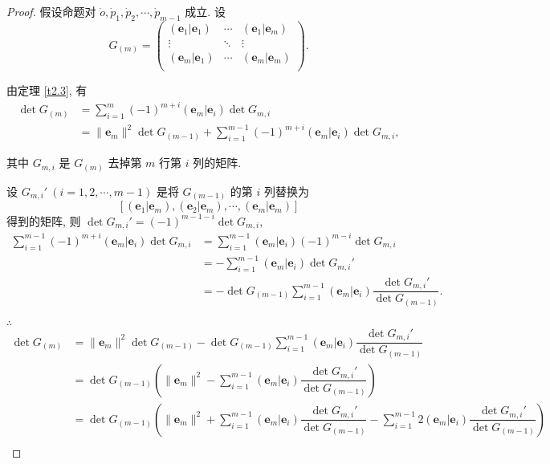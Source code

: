 \documentclass[color=black,device=normal,lang=cn,mode=geye]{elegantnote}
\begin{document}
\begin{proof}
    假设命题对 $\dot{o},\dot{p}_1,\dot{p}_2,\cdots,\dot{p}_{m-1}$ 成立. 设
    \[G_{(m)}=\begin{pmatrix}
        (\boldsymbol{e}_1|\boldsymbol{e}_1) & \cdots & (\boldsymbol{e}_1|\boldsymbol{e}_m) \\
        \vdots & \ddots & \vdots \\
        (\boldsymbol{e}_m|\boldsymbol{e}_1) & \cdots & (\boldsymbol{e}_m|\boldsymbol{e}_m) \\
    \end{pmatrix}.\]
    
    由定理 \ref{t2.3}, 有
    \begin{align*}
        \det G_{(m)} & =\sum\limits_{i=1}^m(-1)^{m+i}(\boldsymbol{e}_m|\boldsymbol{e}_i)\det G_{m,i} \\
        & =\|\boldsymbol{e}_m\|^2\det G_{(m-1)}+\sum\limits_{i=1}^{m-1}(-1)^{m+i}(\boldsymbol{e}_m|\boldsymbol{e}_i)\det G_{m,i},
    \end{align*}

    其中 $G_{m,i}$ 是 $G_{(m)}$ 去掉第 $m$ 行第 $i$ 列的矩阵.
    
    设 $G_{m,i}'\ (i=1,2,\cdots,m-1)$ 是将 $G_{(m-1)}$ 的第 $i$ 列替换为
    \[[(\boldsymbol{e}_1|\boldsymbol{e}_m),(\boldsymbol{e}_2|\boldsymbol{e}_m),\cdots,(\boldsymbol{e}_m|\boldsymbol{e}_m)]\]
    得到的矩阵, 则 $\det G_{m,i}'=(-1)^{m-1-i}\det G_{m,i}$,
    \begin{align*}
        \sum\limits_{i=1}^{m-1}(-1)^{m+i}(\boldsymbol{e}_m|\boldsymbol{e}_i)\det G_{m,i} & =\sum\limits_{i=1}^{m-1}(\boldsymbol{e}_m|\boldsymbol{e}_i)(-1)^{m-i}\det G_{m,i} \\
        & =-\sum\limits_{i=1}^{m-1}(\boldsymbol{e}_m|\boldsymbol{e}_i)\det G_{m,i}' \\
        & =-\det G_{(m-1)}\sum\limits_{i=1}^{m-1}(\boldsymbol{e}_m|\boldsymbol{e}_i)\dfrac{\det G_{m,i}'}{\det G_{(m-1)}}.
    \end{align*}

    $\therefore$
    \begin{align*}
        \det G_{(m)} & =\|\boldsymbol{e}_m\|^2\det G_{(m-1)}-\det G_{(m-1)}\sum\limits_{i=1}^{m-1}(\boldsymbol{e}_m|\boldsymbol{e}_i)\dfrac{\det G_{m,i}'}{\det G_{(m-1)}} \\
        & =\det G_{(m-1)}\left(\|\boldsymbol{e}_m\|^2-\sum\limits_{i=1}^{m-1}(\boldsymbol{e}_m|\boldsymbol{e}_i)\dfrac{\det G_{m,i}'}{\det G_{(m-1)}}\right) \\
        & =\det G_{(m-1)}\left(\|\boldsymbol{e}_m\|^2+\sum\limits_{i=1}^{m-1}(\boldsymbol{e}_m|\boldsymbol{e}_i)\dfrac{\det G_{m,i}'}{\det G_{(m-1)}}-\sum\limits_{i=1}^{m-1}2(\boldsymbol{e}_m|\boldsymbol{e}_i)\dfrac{\det G_{m,i}'}{\det G_{(m-1)}}\right) \\
    \end{align*}
\end{proof}
\end{document}
